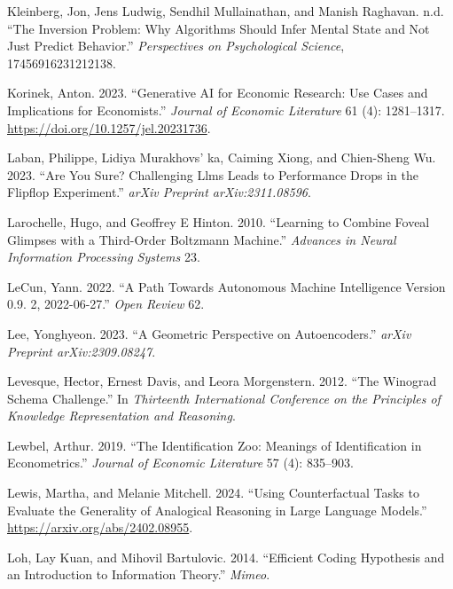 \documentclass[
]{article}
\newlength{\cslhangindent}
\newenvironment{CSLReferences}[2] %
 {\begin{list}{}{%
  \setlength{\itemindent}{0pt}
  \setlength{\leftmargin}{0pt}
  \setlength{\parsep}{0pt}
  \ifodd #1
   \setlength{\leftmargin}{\cslhangindent}
   \setlength{\itemindent}{-1\cslhangindent}
  \fi
  \setlength{\itemsep}{#2\baselineskip}}}
 {\end{list}}
\theoremstyle{plain}
\theoremstyle{definition}
\theoremstyle{remark}
\begin{document}
\begin{CSLReferences}{1}{0}
Kleinberg, Jon, Jens Ludwig, Sendhil Mullainathan, and Manish Raghavan.
n.d. {``The Inversion Problem: Why Algorithms Should Infer Mental State
and Not Just Predict Behavior.''} \emph{Perspectives on Psychological
Science}, 17456916231212138.

Korinek, Anton. 2023. {``Generative AI for Economic Research: Use Cases
and Implications for Economists.''} \emph{Journal of Economic
Literature} 61 (4): 1281--1317.
\url{https://doi.org/10.1257/jel.20231736}.

Laban, Philippe, Lidiya Murakhovs' ka, Caiming Xiong, and Chien-Sheng
Wu. 2023. {``Are You Sure? Challenging Llms Leads to Performance Drops
in the Flipflop Experiment.''} \emph{arXiv Preprint arXiv:2311.08596}.

Larochelle, Hugo, and Geoffrey E Hinton. 2010. {``Learning to Combine
Foveal Glimpses with a Third-Order Boltzmann Machine.''} \emph{Advances
in Neural Information Processing Systems} 23.

LeCun, Yann. 2022. {``A Path Towards Autonomous Machine Intelligence
Version 0.9. 2, 2022-06-27.''} \emph{Open Review} 62.

Lee, Yonghyeon. 2023. {``A Geometric Perspective on Autoencoders.''}
\emph{arXiv Preprint arXiv:2309.08247}.

Levesque, Hector, Ernest Davis, and Leora Morgenstern. 2012. {``The
Winograd Schema Challenge.''} In \emph{Thirteenth International
Conference on the Principles of Knowledge Representation and Reasoning}.

Lewbel, Arthur. 2019. {``The Identification Zoo: Meanings of
Identification in Econometrics.''} \emph{Journal of Economic Literature}
57 (4): 835--903.

Lewis, Martha, and Melanie Mitchell. 2024. {``Using Counterfactual Tasks
to Evaluate the Generality of Analogical Reasoning in Large Language
Models.''} \url{https://arxiv.org/abs/2402.08955}.

Loh, Lay Kuan, and Mihovil Bartulovic. 2014. {``Efficient Coding
Hypothesis and an Introduction to Information Theory.''} \emph{Mimeo}.


\end{CSLReferences}
\end{document}
